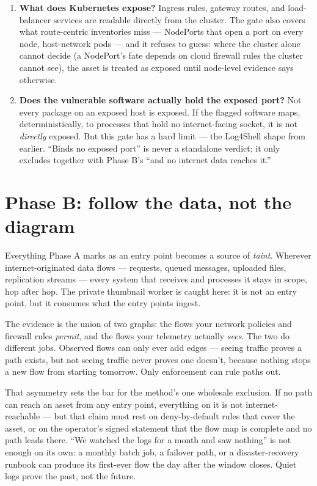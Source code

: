 \documentclass[11pt]{article}
\begin{document}
\begin{enumerate}[leftmargin=1.8em]
  argument --- it defeats FedRAMP's ``an automated unauthenticated system can
  exploit it'' floor --- which shortens nothing about the data path but can
  support a likely-exploitable downgrade.)
\item \textbf{What does Kubernetes expose?} Ingress rules, gateway routes, and
  load-balancer services are readable directly from the cluster. The gate also
  covers what route-centric inventories miss --- NodePorts that open a port on
  every node, host-network pods --- and it refuses to guess: where the cluster
  alone cannot decide (a NodePort's fate depends on cloud firewall rules the
  cluster cannot see), the asset is treated as exposed until node-level evidence
  says otherwise.
\item \textbf{Does the vulnerable software actually hold the exposed port?} Not
  every package on an exposed host is exposed. If the flagged software maps,
  deterministically, to processes that hold no internet-facing socket, it is not
  \emph{directly} exposed. But this gate has a hard limit --- the Log4Shell shape
  from earlier. ``Binds no exposed port'' is never a standalone verdict; it only
  excludes together with Phase B's ``and no internet data reaches it.''
\end{enumerate}

\section*{Phase B: follow the data, not the diagram}
Everything Phase A marks as an entry point becomes a source of \emph{taint}.
Wherever internet-originated data flows --- requests, queued messages, uploaded
files, replication streams --- every system that receives and processes it stays
in scope, hop after hop. The private thumbnail worker is caught here: it is not an
entry point, but it consumes what the entry points ingest.

The evidence is the union of two graphs: the flows your network policies and
firewall rules \emph{permit}, and the flows your telemetry actually \emph{sees}.
The two do different jobs. Observed flows can only ever add edges --- seeing
traffic proves a path exists, but not seeing traffic never proves one doesn't,
because nothing stops a new flow from starting tomorrow. Only enforcement can rule
paths out.

That asymmetry sets the bar for the method's one wholesale exclusion. If no path
can reach an asset from any entry point, everything on it is not
internet-reachable --- but that claim must rest on deny-by-default rules that
cover the asset, or on the operator's signed statement that the flow map is
complete and no path leads there. ``We watched the logs for a month and saw
nothing'' is not enough on its own: a monthly batch job, a failover path, or a
disaster-recovery runbook can produce its first-ever flow the day after the window
closes. Quiet logs prove the past, not the future.
\end{document}
